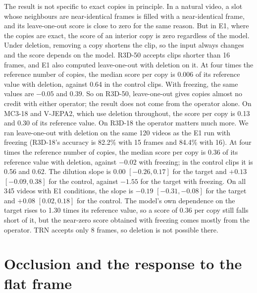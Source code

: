 The result is not specific to exact copies in principle.
In a natural video, a slot whose neighbours are near-identical frames is filled with a near-identical frame, and its leave-one-out score is close to zero for the same reason.
But in E1, where the copies are exact, the score of an interior copy is zero regardless of the model.
Under deletion, removing a copy shortens the clip, so the input always changes and the score depends on the model.
R3D-50 accepts clips shorter than 16 frames, and E1 also computed leave-one-out with deletion on it.
At four times the reference number of copies, the median score per copy is 0.006 of its reference value with deletion, against 0.64 in the control clips.
With freezing, the same values are $-0.05$ and $0.39$.
So on R3D-50, leave-one-out gives copies almost no credit with either operator; the result does not come from the operator alone.
On MC3-18 and V-JEPA2, which use deletion throughout, the score per copy is 0.13 and 0.30 of its reference value.
On R3D-18 the operator matters much more.
We ran leave-one-out with deletion on the same 120 videos as the E1 run with freezing (R3D-18's accuracy is 82.2\% with 15 frames and 84.4\% with 16).
At four times the reference number of copies, the median score per copy is 0.36 of its reference value with deletion, against $-0.02$ with freezing; in the control clips it is 0.56 and 0.62.
The dilution slope is $0.00$ $[-0.26, 0.17]$ for the target and $+0.13$ $[-0.09, 0.38]$ for the control, against $-1.55$ for the target with freezing.
On all 345 videos with E1 conditions, the slope is $-0.19$ $[-0.31, -0.08]$ for the target and $+0.08$ $[0.02, 0.18]$ for the control.
The model's own dependence on the target rises to 1.30 times its reference value, so a score of 0.36 per copy still falls short of it, but the near-zero score obtained with freezing comes mostly from the operator.
TRN accepts only 8 frames, so deletion is not possible there.

\section{Occlusion and the response to the flat frame}
\label{app:flat-frame}


